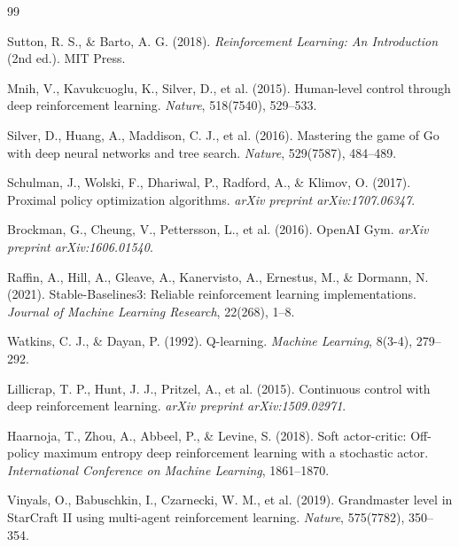 \documentclass[12pt,a4paper]{article}
\begin{document}
\begin{thebibliography}{99}

Sutton, R. S., \& Barto, A. G. (2018).
\textit{Reinforcement Learning: An Introduction} (2nd ed.).
MIT Press.

Mnih, V., Kavukcuoglu, K., Silver, D., et al. (2015).
Human-level control through deep reinforcement learning.
\textit{Nature}, 518(7540), 529--533.

Silver, D., Huang, A., Maddison, C. J., et al. (2016).
Mastering the game of Go with deep neural networks and tree search.
\textit{Nature}, 529(7587), 484--489.

Schulman, J., Wolski, F., Dhariwal, P., Radford, A., \& Klimov, O. (2017).
Proximal policy optimization algorithms.
\textit{arXiv preprint arXiv:1707.06347}.

Brockman, G., Cheung, V., Pettersson, L., et al. (2016).
OpenAI Gym.
\textit{arXiv preprint arXiv:1606.01540}.

Raffin, A., Hill, A., Gleave, A., Kanervisto, A., Ernestus, M., \& Dormann, N. (2021).
Stable-Baselines3: Reliable reinforcement learning implementations.
\textit{Journal of Machine Learning Research}, 22(268), 1--8.

Watkins, C. J., \& Dayan, P. (1992).
Q-learning.
\textit{Machine Learning}, 8(3-4), 279--292.

Lillicrap, T. P., Hunt, J. J., Pritzel, A., et al. (2015).
Continuous control with deep reinforcement learning.
\textit{arXiv preprint arXiv:1509.02971}.

Haarnoja, T., Zhou, A., Abbeel, P., \& Levine, S. (2018).
Soft actor-critic: Off-policy maximum entropy deep reinforcement learning with a stochastic actor.
\textit{International Conference on Machine Learning}, 1861--1870.

Vinyals, O., Babuschkin, I., Czarnecki, W. M., et al. (2019).
Grandmaster level in StarCraft II using multi-agent reinforcement learning.
\textit{Nature}, 575(7782), 350--354.

\end{thebibliography}
\end{document}
